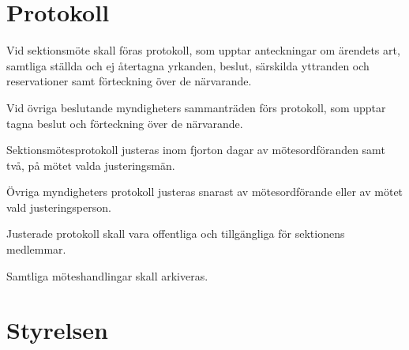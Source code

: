 \documentclass[stadgar]{dsekprotokoll}
\begin{document}
\section{Protokoll}

\begin{stadgeavsnitt}


Vid sektionsmöte skall föras protokoll, som upptar anteckningar om ärendets
art, samtliga ställda och ej återtagna yrkanden, beslut, särskilda
yttranden och reservationer samt förteckning över de närvarande.


Vid övriga beslutande myndigheters sammanträden förs protokoll, som upptar
tagna beslut och förteckning över de närvarande.


Sektionsmötesprotokoll justeras inom fjorton dagar av mötesordföranden samt två, på mötet valda justeringsmän.

Övriga myndigheters protokoll justeras snarast av mötesordförande eller av mötet vald justeringsperson.


Justerade protokoll skall vara offentliga och tillgängliga för sektionens medlemmar.


Samtliga möteshandlingar skall arkiveras.

\end{stadgeavsnitt}

\section{Styrelsen}
\end{document}

